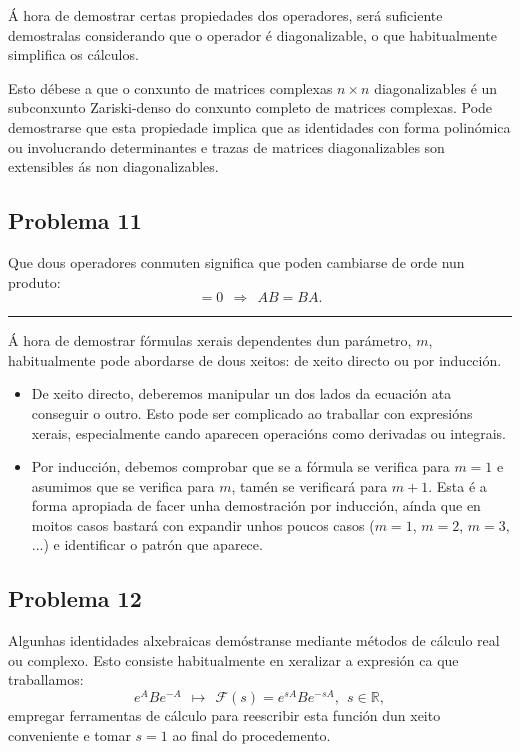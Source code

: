 \documentclass[a4paper,12pt]{article}
\begin{document}
Á hora de demostrar certas propiedades dos operadores, será suficiente demostralas considerando que o operador é diagonalizable, o que habitualmente simplifica os cálculos.

Esto débese a que o conxunto de matrices complexas $n \times n$ diagonalizables é un subconxunto Zariski-denso do conxunto completo de matrices complexas. Pode demostrarse que esta propiedade implica que as identidades con forma polinómica ou involucrando determinantes e trazas de matrices diagonalizables son extensibles ás non diagonalizables.

\subsection*{Problema 11}

Que dous operadores conmuten significa que poden cambiarse de orde nun produto:
\begin{equation}
	[A,B] = 0 ~~ \Longrightarrow ~~ AB = BA.
\end{equation}

\begin{center} \hrule \end{center}

Á hora de demostrar fórmulas xerais dependentes dun parámetro, $m$, habitualmente pode abordarse de dous xeitos: de xeito directo ou por inducción.
\begin{itemize}
	\item[$\bullet$] De xeito directo, deberemos manipular un dos lados da ecuación ata conseguir o outro. Esto pode ser complicado ao traballar con expresións xerais, especialmente cando aparecen operacións como derivadas ou integrais.
	\item[$\bullet$] Por inducción, debemos comprobar que se a fórmula se verifica para $m=1$ e asumimos que se verifica para $m$, tamén se verificará para $m+1$. Esta é a forma apropiada de facer unha demostración por inducción, aínda que en moitos casos bastará con expandir unhos poucos casos ($m=1$, $m=2$, $m=3$, ...) e identificar o patrón que aparece.
\end{itemize}

\subsection*{Problema 12}

Algunhas identidades alxebraicas demóstranse mediante métodos de cálculo real ou complexo. Esto consiste habitualmente en xeralizar a expresión ca que traballamos:
\begin{equation}
	e^A B e^{-A} ~~ \mapsto ~~ \mathcal{F}(s) = e^{sA} B e^{-sA}, ~~ s \in \mathbb{R},
\end{equation}
\noindent
empregar ferramentas de cálculo para reescribir esta función dun xeito conveniente e tomar $s=1$ ao final do procedemento.
\end{document}
